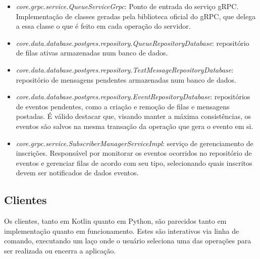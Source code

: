 \documentclass{article}
\begin{document}
    \begin{itemize}
        \item \textit{core.grpc.service.QueueServiceGrpc}: Ponto de entrada do serviço gRPC. Implementação de classes geradas pela biblioteca oficial do gRPC, que delega a essa classe o que é feito em cada operação do servidor.

        \item \textit{core.data.database.postgres.repository.QueueRepositoryDatabase}: repositório de filas ativas armazenadas num banco de dados.

        \item \textit{core.data.database.postgres.repository.TextMessageRepositoryDatabase}: repositório de mensagens pendentes armazenadas num banco de dados.

        \item \textit{core.data.database.postgres.repository.EventRepositoryDatabase}: repositórios de eventos pendentes, como a criação e remoção de filas e mensagens postadas.
        É válido destacar que, visando manter a máxima consistências, os eventos são salvos na mesma transação da operação que gera o evento em si.

        \item \textit{core.grpc.service.SubscriberManagerServiceImpl}: serviço de gerenciamento de inscrições.
        Responsável por monitorar os eventos ocorridos no repositório de eventos e gerenciar filas de acordo com seu tipo, selecionando quais inscritos devem ser notificados de dados eventos.

    \end{itemize}

    \subsection{Clientes}\label{subsec:clientes}

    Os clientes, tanto em Kotlin quanto em Python, são parecidos tanto em implementação quanto em funcionamento.
    Estes são interativos via linha de comando, executando um laço onde o usuário seleciona uma das operações para ser realizada ou encerra a aplicação.
\end{document}
